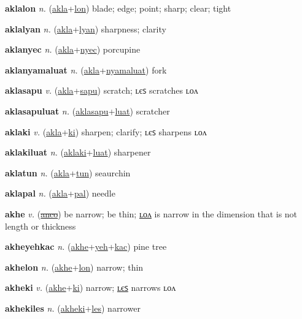 \textbf{\hypertarget{aklalon}{aklalon}} \textit{n.} (\hyperlink{akla}{akla}+\allowbreak \hyperlink{lon}{lon})
blade; edge; point; sharp; clear; tight

\textbf{\hypertarget{aklalyan}{aklalyan}} \textit{n.} (\hyperlink{akla}{akla}+\allowbreak \hyperlink{lyan}{lyan})
sharpness; clarity

\textbf{\hypertarget{aklanyec}{aklanyec}} \textit{n.} (\hyperlink{akla}{akla}+\allowbreak \hyperlink{nyec}{nyec})
porcupine

\textbf{\hypertarget{aklanyamaluat}{aklanyamaluat}} \textit{n.} (\hyperlink{akla}{akla}+\allowbreak \hyperlink{nyamaluat}{nyamaluat})
fork

\textbf{\hypertarget{aklasapu}{aklasapu}} \textit{v.} (\hyperlink{akla}{akla}+\allowbreak \hyperlink{sapu}{sapu})
scratch; ʟєꜱ scratches ʟᴏᴧ

\textbf{\hypertarget{aklasapuluat}{aklasapuluat}} \textit{n.} (\hyperlink{aklasapu}{aklasapu}+\allowbreak \hyperlink{luat}{luat})
scratcher

\textbf{\hypertarget{aklaki}{aklaki}} \textit{v.} (\hyperlink{akla}{akla}+\allowbreak \hyperlink{ki}{ki})
sharpen; clarify; ʟєꜱ sharpens ʟᴏᴧ

\textbf{\hypertarget{aklakiluat}{aklakiluat}} \textit{n.} (\hyperlink{aklaki}{aklaki}+\allowbreak \hyperlink{luat}{luat})
sharpener

\textbf{\hypertarget{aklatun}{aklatun}} \textit{n.} (\hyperlink{akla}{akla}+\allowbreak \hyperlink{tun}{tun})
seaurchin

\textbf{\hypertarget{aklapal}{aklapal}} \textit{n.} (\hyperlink{akla}{akla}+\allowbreak \hyperlink{pal}{pal})
needle

\textbf{\hypertarget{akhe}{akhe}} \textit{v.} (\hyperlink{anco}{\sout{anco}})
be narrow; be thin; \hyperlink{akhelon}{ʟᴏᴧ} is narrow in the dimension that is not length or thickness

\textbf{\hypertarget{akheyehkac}{akheyehkac}} \textit{n.} (\hyperlink{akhe}{akhe}+\allowbreak \hyperlink{yeh}{yeh}+\allowbreak \hyperlink{kac}{kac})
pine tree

\textbf{\hypertarget{akhelon}{akhelon}} \textit{n.} (\hyperlink{akhe}{akhe}+\allowbreak \hyperlink{lon}{lon})
narrow; thin

\textbf{\hypertarget{akheki}{akheki}} \textit{v.} (\hyperlink{akhe}{akhe}+\allowbreak \hyperlink{ki}{ki})
narrow; \hyperlink{akhekiles}{ʟєꜱ} narrows ʟᴏᴧ

\textbf{\hypertarget{akhekiles}{akhekiles}} \textit{n.} (\hyperlink{akheki}{akheki}+\allowbreak \hyperlink{les}{les})
narrower

